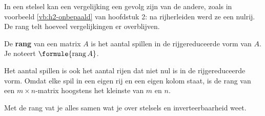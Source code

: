 In een stelsel kan een vergelijking een gevolg zijn van de andere, zoals in voorbeeld \ref{vb:h2-onbepaald} van hoofdstuk 2: na rijherleiden werd ze een nulrij. De rang telt hoeveel vergelijkingen er overblijven.

\begin{theorie}
De \textbf{\textcolor{accent}{rang}} van een matrix $A$ is het aantal spillen in de rijgereduceerde vorm van $A$. Je noteert $\formule{\operatorname{rang} A}$.
\end{theorie}

Het aantal spillen is ook het aantal rijen dat niet nul is in de rijgereduceerde vorm. Omdat elke spil in een eigen rij en een eigen kolom staat, is de rang van een $m \times n$-matrix hoogstens het kleinste van $m$ en $n$.


Met de rang vat je alles samen wat je over stelsels en inverteerbaarheid weet.

